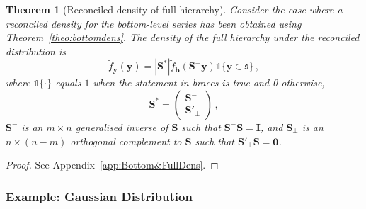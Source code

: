 \documentclass[11pt]{article}
\newtheorem{theo}{Theorem}[section]
\theoremstyle{definition}
\begin{document}
\begin{theo}[Reconciled density of full hierarchy]\label{theo:fulldens}
	Consider the case where a reconciled density for the bottom-level series has been obtained using Theorem~\ref{theo:bottomdens}. The density of the full hierarchy under the reconciled distribution is
	\[
	 \tilde{f}_{\bm{y}}(\bm{y}) =
     |\bm{S}^*| \tilde{f}_{\bm{b}}({\bm{S}^-\bm{y}})
     \mathbb{1}\{\bm{y}\in\mathfrak{s}\}\,,
	\]
	where $\mathbb{1}\{\cdot\}$ equals $1$ when the statement in braces is true and 0 otherwise,
	\[
    \bm{S}^*=\begin{pmatrix}
      \bm{S}^-\\
      \bm{S}'_\perp
    \end{pmatrix}\,,
  \]
	$\bm{S^-}$ is an $m\times n$ generalised inverse of $\bm{S}$ such that $\bm{S}^-\bm{S}=\bm{I}$,
  and $\bm{S_\perp}$ is an $n\times (n-m)$ orthogonal complement to $\bm{S}$ such that $\bm{S}'_\perp\bm{S}=\bm{0}$.
\end{theo}

\begin{proof}
	See Appendix~\ref{app:Bottom&FullDens}.
\end{proof}

\subsubsection*{Example: Gaussian Distribution}
\end{document}
